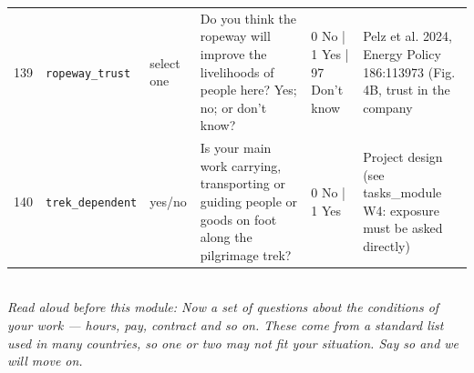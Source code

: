 \documentclass[9pt,a4paper,landscape]{article}
\begin{document}
\begin{longtable}{@{}p{0.5cm}p{3.3cm}p{1.7cm}p{7.3cm}p{5.6cm}p{5.4cm}@{}}
\footnotesize 139 & \footnotesize\texttt{ropeway\_trust} & \scriptsize select one & \footnotesize Do you think the ropeway will improve the livelihoods of people here? Yes; no; or don't know?\par\vspace{1pt}{\footnotesize\color{hdr}{\hifont क्या आपको लगता है कि रोपवे से यहाँ के लोगों की रोज़ी-रोटी सुधरेगी? हाँ; नहीं; या पता नहीं?}} & \scriptsize 0 No | 1 Yes | 97 Don't know & \scriptsize Pelz et al. 2024, Energy Policy 186:113973 (Fig. 4B, trust in the company\\
\footnotesize 140 & \footnotesize\texttt{trek\_dependent} & \scriptsize yes/no & \footnotesize Is your main work carrying, transporting or guiding people or goods on foot along the pilgrimage trek?\par\vspace{1pt}{\footnotesize\color{hdr}{\hifont क्या आपका मुख्य यात्रा-काम गौरीकुंड से केदारनाथ के पैदल रास्ते पर लोगों या सामान को ले जाना, पहुँचाना या रास्ता दिखाना है?}} & \scriptsize 0 No | 1 Yes & \scriptsize Project design (see tasks\_module W4: exposure must be asked directly)\\
\bottomrule\end{longtable}\vspace{6pt}
\\[3pt]
{\small\itshape Read aloud before this module: Now a set of questions about the conditions of your work — hours, pay, contract and so on. These come from a standard list used in many countries, so one or two may not fit your situation. Say so and we will move on.}\\[5pt]
\end{document}
